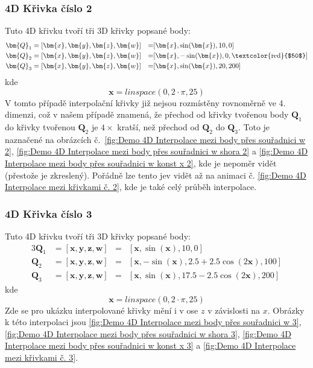 \subsubsection{4D Křivka číslo 2}
Tuto 4D křivku tvoří tři 3D křivky popsané body:
\begin{alignat}{3}
    \bm{Q}_1 & = [\bm{x}, \bm{y}, \bm{z}, \bm{w}] & = & [\bm{x}, \sin(\bm{x}), 10, 0]                            \\
    \bm{Q}_2 & = [\bm{x}, \bm{y}, \bm{z}, \bm{w}] & = & [\bm{x}, -\sin(\bm{x}), 0, \text{\textcolor{red}{$50$}}] \\
    \bm{Q}_3 & = [\bm{x}, \bm{y}, \bm{z}, \bm{w}] & = & [\bm{x}, \sin(\bm{x}), 20, 200]
\end{alignat}
kde
\begin{equation}
    \bm{x} = linspace(0, 2\cdot\pi, 25)
\end{equation}
V tomto případě interpolační křivky již nejsou rozmístěny rovnoměrně ve 4. dimenzi,
což v našem případě znamená, že přechod od křivky tvořenou body $\bm{Q}_1$ do křivky
tvořenou $\bm{Q}_2$ je $4\times$ kratší, než přechod od $\bm{Q}_2$ do $\bm{Q}_3$. Toto
je naznačené na obrázcích č.~\ref{fig:Demo 4D Interpolace mezi body přes souřadnici w 2},
\ref{fig:Demo 4D Interpolace mezi body přes souřadnici w shora 2} a
\ref{fig:Demo 4D Interpolace mezi body přes souřadnici w konst x 2},
kde je nepoměr vidět (přestože je zkreslený).
Pořádně lze tento jev vidět až na animaci č. \ref{fig:Demo 4D Interpolace mezi křivkami č. 2},
kde je také celý průběh interpolace.

\subsubsection{4D Křivka číslo 3}
Tuto 4D křivku tvoří tři 3D křivky popsané body:
\begin{alignat}{3}
    \bm{Q}_1 & = [\bm{x}, \bm{y}, \bm{z}, \bm{w}] & = & [\bm{x}, \sin(\bm{x}), 10, 0]                        \\
    \bm{Q}_2 & = [\bm{x}, \bm{y}, \bm{z}, \bm{w}] & = & [\bm{x}, -\sin(\bm{x}), 2.5 + 2.5\cos(2\bm{x}), 100] \\
    \bm{Q}_3 & = [\bm{x}, \bm{y}, \bm{z}, \bm{w}] & = & [\bm{x}, \sin(\bm{x}), 17.5 - 2.5\cos(2\bm{x}), 200]
\end{alignat}
kde
\begin{equation}
    \bm{x} = linspace(0, 2\cdot\pi, 25)
\end{equation}
Zde se pro ukázku interpolované křivky mění i v ose $z$ v závislosti na $x$.
Obrázky k této interpolaci jsou \ref{fig:Demo 4D Interpolace mezi body přes souřadnici w 3},
\ref{fig:Demo 4D Interpolace mezi body přes souřadnici w shora 3},
\ref{fig:Demo 4D Interpolace mezi body přes souřadnici w konst x 3} a
\ref{fig:Demo 4D Interpolace mezi křivkami č. 3}.

